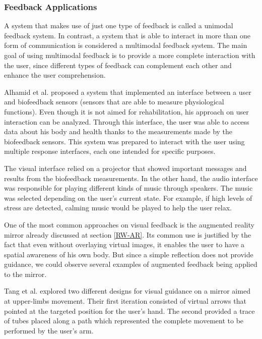 \documentclass[runningheads]{llncs}
\begin{document}
\subsubsection{Feedback Applications}

A system that makes use of just one type of feedback is called a unimodal feedback system. 
In contrast, a system that is able to interact in more than one form of communication is considered a multimodal feedback system.
The main goal of using multimodal feedback is to provide a more complete interaction with the user, 
since different types of feedback can complement each other and enhance the user comprehension\cite{Sigrist2013}.

Alhamid et al. \cite{Alhamid2012a} proposed a system
that implemented an interface between a user and biofeedback sensors (sensors that are able 
to measure physiological functions). Even though it is not aimed for rehabilitation, his approach on user interaction can be analyzed.
Through this interface, the user was able to access data about his body and health thanks to the measurements made by the biofeedback sensors.
This system was prepared to interact with the user using multiple response interfaces, each one intended for specific purposes.

The visual interface relied on a projector that showed important messages and results from the biofeedback measurements.
In the other hand, the audio interface was responsible for playing different kinds of music through speakers. 
The music was selected depending on the user's current state. For example, if high levels of stress are detected, 
calming music would be played to help the user relax.

One of the most common approaches on visual feedback is the augmented reality mirror already discussed at section \ref{RW-AR}. Its common
use is justified by the fact that even without overlaying virtual images, it enables the user to have a spatial awareness of his own body.
But since a simple reflection does not provide guidance, we could observe several examples of augmented feedback being applied to the mirror.

Tang et al. \cite{Tang2014a} explored two different designs for visual guidance on a mirror aimed at upper-limbs movement.
Their first iteration consisted of virtual arrows that pointed at the targeted position for the user's hand.
The second provided a trace of tubes placed along a path which represented the complete movement to be performed by the user's arm.
\end{document}
